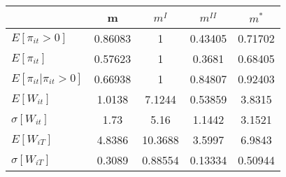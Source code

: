 \begin{tabular}{lcccc}
& m & $m^I$ & $m^{II}$ & $m^*$ \\ 
\hline 
$E[\pi_{it}>0]$ & 0.86083 & 1 & 0.43405 & 0.71702 \\ 
$E[\pi_{it}]$ & 0.57623 & 1 & 0.3681 & 0.68405 \\ 
$E[\pi_{it}|\pi_{it}>0]$ & 0.66938 & 1 & 0.84807 & 0.92403 \\ 
$E[W_{it}]$ & 1.0138 & 7.1244 & 0.53859 & 3.8315 \\ 
$\sigma[W_{it}]$ & 1.73 & 5.16 & 1.1442 & 3.1521 \\ 
$E[W_{iT}]$ & 4.8386 & 10.3688 & 3.5997 & 6.9843 \\ 
$\sigma[W_{iT}]$ & 0.3089 & 0.88554 & 0.13334 & 0.50944 \\ 
\hline 
\end{tabular}